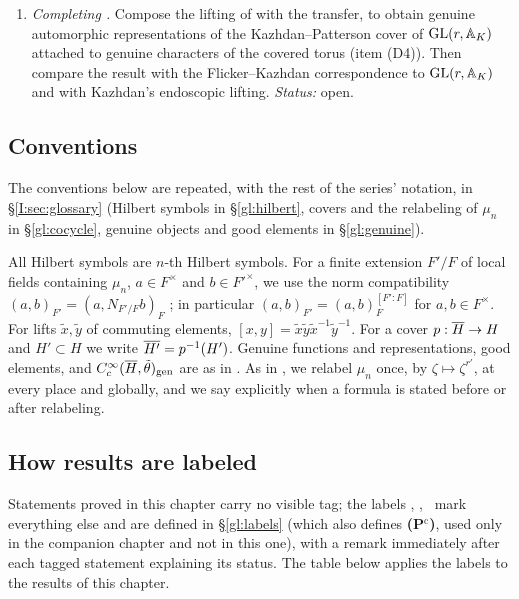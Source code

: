 \begin{enumerate}[label=(\roman*)]
\item \emph{Completing \cite[Remark~10.3]{JC26a}.} Compose the lifting of \cite{JC26a} with the transfer, to obtain genuine automorphic representations of the Kazhdan--Patterson cover of $\mathrm{GL}(r,\mathbb{A}_K)$ attached to genuine characters of the covered torus (item (D4)). Then compare the result with the Flicker--Kazhdan correspondence \cite{FK86} to $\mathrm{GL}(r,\mathbb{A}_K)$ and with Kazhdan's endoscopic lifting. \emph{Status:} open.
\end{enumerate}

\subsection{Conventions}\label{I:subsec:conventions}
The conventions below are repeated, with the rest of the series' notation, in \S\ref{I:sec:glossary} (Hilbert symbols in \S\ref{gl:hilbert}, covers and the relabeling of $\mu_n$ in \S\ref{gl:cocycle}, genuine objects and good elements in \S\ref{gl:genuine}).

All Hilbert symbols are $n$-th Hilbert symbols. For a finite extension $F'/F$ of local fields containing $\mu_n$, $a\in F^\times$ and $b\in F'^\times$, we use the norm compatibility $(a,b)_{F'}=(a,N_{F'/F}b)_F$ \cite[Ch.~XIV]{Ser79}; in particular $(a,b)_{F'}=(a,b)_F^{[F':F]}$ for $a,b\in F^\times$. For lifts $\tilde x,\tilde y$ of commuting elements, $[x,y]=\tilde x\tilde y\tilde x^{-1}\tilde y^{-1}$. For a cover $p:\overline{H}\to H$ and $H'\subset H$ we write $\overline{H'}=p^{-1}(H')$. Genuine functions and representations, good elements, and $C_c^\infty(\overline{H},\tilde\theta)_{\mathrm{gen}}$ are as in \cite[\S\S1--2]{JC26a}. As in \cite[\S6.1]{JC26a}, we relabel $\mu_n$ once, by $\zeta\mapsto\zeta^{r'}$, at every place and globally, and we say explicitly when a formula is stated before or after relabeling.

\subsection{How results are labeled}
Statements proved in this chapter carry no visible tag; the labels
\Ev, \Ov, \Cv\ mark everything else and are defined in
\S\ref{gl:labels} (which also defines \textbf{(P$^{\mathrm
c}$)}, used only in the companion chapter and not in this one), with
a remark immediately after each tagged statement explaining its
status. The table below applies the labels to the results of this
chapter.


